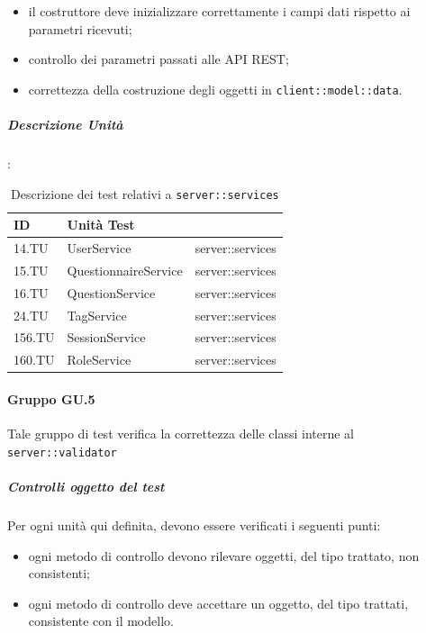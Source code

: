 \documentclass[12pt,a4paper]{article}
\begin{document}
\begin{itemize}
	\item il costruttore deve inizializzare correttamente i campi dati rispetto ai parametri ricevuti;
	\item controllo dei parametri passati alle API REST;
	\item correttezza della costruzione degli oggetti in \texttt{client::model::data}.
\end{itemize}

\subparagraph{Descrizione Unità}:

\begin{table}[H]
	\begin{center}
		\begin{tabular}{p{} p{} p{}}
			\toprule
			\textbf{ID}   & \textbf{Unità Test}	& \textbf{\mgls{package}} \\ \midrule
			\midrule
			14.TU & UserService & server::services\\ \midrule
			15.TU & QuestionnaireService & server::services\\ \midrule
			16.TU & QuestionService & server::services\\ \midrule
			24.TU & TagService & server::services\\ \midrule
			156.TU & SessionService & server::services\\ \midrule
			160.TU & RoleService & server::services\\ \midrule			
			\bottomrule
		\end{tabular}
	\end{center}
	\caption{Descrizione dei test relativi a \texttt{server::services}}
\end{table}

\paragraph{Gruppo GU.5}
Tale gruppo di test verifica la correttezza delle classi interne al  \texttt{server::validator}

\subparagraph{Controlli oggetto del test}
Per ogni unità  qui definita, devono essere verificati i seguenti punti:

\begin{itemize}
	\item ogni metodo di controllo devono rilevare oggetti, del tipo trattato, non consistenti;
	\item ogni metodo di controllo deve accettare un oggetto, del tipo trattati, consistente con il modello.
\end{itemize}
\end{document}
